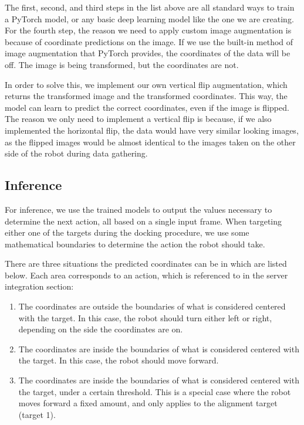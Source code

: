 The first, second, and third steps in the list above are all standard ways to train a PyTorch model, or any basic deep learning model like the one we are creating. For the fourth step, the reason we need to apply custom image augmentation is because of coordinate predictions on the image. If we use the built-in method of image augmentation that PyTorch provides, the coordinates of the data will be off. The image is being transformed, but the coordinates are not. 

In order to solve this, we implement our own vertical flip augmentation, which returns the transformed image and the transformed coordinates. This way, the model can learn to predict the correct coordinates, even if the image is flipped. The reason we only need to implement a vertical flip is because, if we also implemented the horizontal flip, the data would have very similar looking images, as the flipped images would be almost identical to the images taken on the other side of the robot during data gathering.

\subsection{Inference}
For inference, we use the trained models to output the values necessary to determine the next action, all based on a single input frame. When targeting either one of the targets during the docking procedure, we use some mathematical boundaries to determine the action the robot should take.

There are three situations the predicted coordinates can be in which are listed below. Each area corresponds to an action, which is referenced to in the server integration section:

\begin{enumerate}
	\item The coordinates are outside the boundaries of what is considered centered with the target. In this case, the robot should turn either left or right, depending on the side the coordinates are on.
	\item The coordinates are inside the boundaries of what is considered centered with the target. In this case, the robot should move forward.
	\item The coordinates are inside the boundaries of what is considered centered with the target, under a certain threshold. This is a special case where the robot moves forward a fixed amount, and only applies to the alignment target (target 1).
\end{enumerate}

